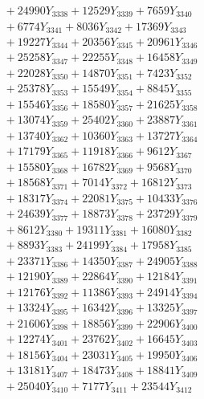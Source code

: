 \documentclass[a4paper,10pt]{article}
\begin{document}
{\begin{align}
&\;  + 24990 Y_{3338} + 12529 Y_{3339} + 7659 Y_{3340} \\[0.3ex]
&\;  + 6774 Y_{3341} + 8036 Y_{3342} + 17369 Y_{3343} \\[0.3ex]
&\;  + 19227 Y_{3344} + 20356 Y_{3345} + 20961 Y_{3346} \\[0.3ex]
&\;  + 25258 Y_{3347} + 22255 Y_{3348} + 16458 Y_{3349} \\[0.3ex]
&\;  + 22028 Y_{3350} + 14870 Y_{3351} + 7423 Y_{3352} \\[0.3ex]
&\;  + 25378 Y_{3353} + 15549 Y_{3354} + 8845 Y_{3355} \\[0.3ex]
&\;  + 15546 Y_{3356} + 18580 Y_{3357} + 21625 Y_{3358} \\[0.5ex]\allowbreak
&\;  + 13074 Y_{3359} + 25402 Y_{3360} + 23887 Y_{3361} \\[0.3ex]
&\;  + 13740 Y_{3362} + 10360 Y_{3363} + 13727 Y_{3364} \\[0.3ex]
&\;  + 17179 Y_{3365} + 11918 Y_{3366} + 9612 Y_{3367} \\[0.3ex]
&\;  + 15580 Y_{3368} + 16782 Y_{3369} + 9568 Y_{3370} \\[0.3ex]
&\;  + 18568 Y_{3371} + 7014 Y_{3372} + 16812 Y_{3373} \\[0.3ex]
&\;  + 18317 Y_{3374} + 22081 Y_{3375} + 10433 Y_{3376} \\[0.3ex]
&\;  + 24639 Y_{3377} + 18873 Y_{3378} + 23729 Y_{3379} \\[0.3ex]
&\;  + 8612 Y_{3380} + 19311 Y_{3381} + 16080 Y_{3382} \\[0.3ex]
&\;  + 8893 Y_{3383} + 24199 Y_{3384} + 17958 Y_{3385} \\[0.3ex]
&\;  + 23371 Y_{3386} + 14350 Y_{3387} + 24905 Y_{3388} \\[0.5ex]\allowbreak
&\;  + 12190 Y_{3389} + 22864 Y_{3390} + 12184 Y_{3391} \\[0.3ex]
&\;  + 12176 Y_{3392} + 11386 Y_{3393} + 24914 Y_{3394} \\[0.3ex]
&\;  + 13324 Y_{3395} + 16342 Y_{3396} + 13325 Y_{3397} \\[0.3ex]
&\;  + 21606 Y_{3398} + 18856 Y_{3399} + 22906 Y_{3400} \\[0.3ex]
&\;  + 12274 Y_{3401} + 23762 Y_{3402} + 16645 Y_{3403} \\[0.3ex]
&\;  + 18156 Y_{3404} + 23031 Y_{3405} + 19950 Y_{3406} \\[0.3ex]
&\;  + 13181 Y_{3407} + 18473 Y_{3408} + 18841 Y_{3409} \\[0.3ex]
&\;  + 25040 Y_{3410} + 7177 Y_{3411} + 23544 Y_{3412} \\[0.3ex]

\end{align}}
\end{document}
